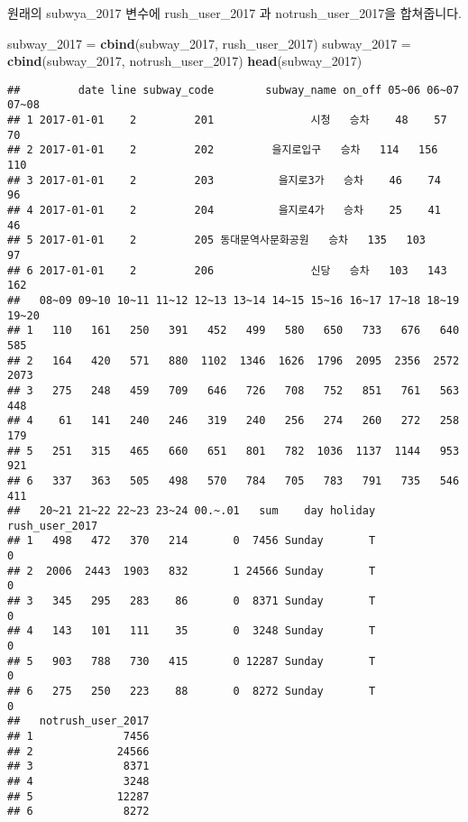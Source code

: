 \documentclass[]{article}
\newenvironment{Shaded}{\begin{snugshade}}{\end{snugshade}}
\newcommand{\KeywordTok}[1]{\textcolor[rgb]{0.13,0.29,0.53}{\textbf{#1}}}
\newcommand{\DecValTok}[1]{\textcolor[rgb]{0.00,0.00,0.81}{#1}}
\newcommand{\StringTok}[1]{\textcolor[rgb]{0.31,0.60,0.02}{#1}}
\newcommand{\NormalTok}[1]{#1}
\begin{document}
원래의 subwya\_2017 변수에 rush\_user\_2017 과 notrush\_user\_2017을
합쳐줍니다.

\begin{Shaded}
\begin{Highlighting}[]
\NormalTok{subway_}\DecValTok{2017}\NormalTok{ =}\StringTok{ }\KeywordTok{cbind}\NormalTok{(subway_}\DecValTok{2017}\NormalTok{, rush_user_}\DecValTok{2017}\NormalTok{)}
\NormalTok{subway_}\DecValTok{2017}\NormalTok{ =}\StringTok{ }\KeywordTok{cbind}\NormalTok{(subway_}\DecValTok{2017}\NormalTok{, notrush_user_}\DecValTok{2017}\NormalTok{)}
\KeywordTok{head}\NormalTok{(subway_}\DecValTok{2017}\NormalTok{)}
\end{Highlighting}
\end{Shaded}

\begin{verbatim}
##         date line subway_code        subway_name on_off 05~06 06~07 07~08
## 1 2017-01-01    2         201               시청   승차    48    57    70
## 2 2017-01-01    2         202         을지로입구   승차   114   156   110
## 3 2017-01-01    2         203          을지로3가   승차    46    74    96
## 4 2017-01-01    2         204          을지로4가   승차    25    41    46
## 5 2017-01-01    2         205 동대문역사문화공원   승차   135   103    97
## 6 2017-01-01    2         206               신당   승차   103   143   162
##   08~09 09~10 10~11 11~12 12~13 13~14 14~15 15~16 16~17 17~18 18~19 19~20
## 1   110   161   250   391   452   499   580   650   733   676   640   585
## 2   164   420   571   880  1102  1346  1626  1796  2095  2356  2572  2073
## 3   275   248   459   709   646   726   708   752   851   761   563   448
## 4    61   141   240   246   319   240   256   274   260   272   258   179
## 5   251   315   465   660   651   801   782  1036  1137  1144   953   921
## 6   337   363   505   498   570   784   705   783   791   735   546   411
##   20~21 21~22 22~23 23~24 00.~.01   sum    day holiday rush_user_2017
## 1   498   472   370   214       0  7456 Sunday       T              0
## 2  2006  2443  1903   832       1 24566 Sunday       T              0
## 3   345   295   283    86       0  8371 Sunday       T              0
## 4   143   101   111    35       0  3248 Sunday       T              0
## 5   903   788   730   415       0 12287 Sunday       T              0
## 6   275   250   223    88       0  8272 Sunday       T              0
##   notrush_user_2017
## 1              7456
## 2             24566
## 3              8371
## 4              3248
## 5             12287
## 6              8272
\end{verbatim}
\end{document}
